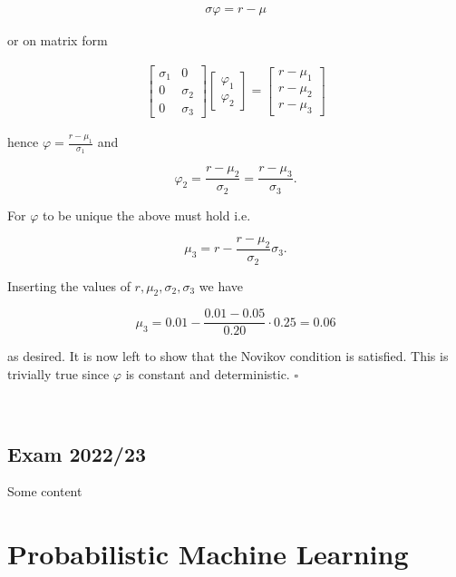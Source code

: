 \documentclass[
]{book}
\begin{document}
\begin{align*}
\sigma \varphi=r-\mu
\end{align*}

or on matrix form

\begin{align*}
\begin{bmatrix}
\sigma_1 & 0\\
0 & \sigma_2\\
0 & \sigma_3
\end{bmatrix}
\begin{bmatrix}
\varphi_1\\
\varphi_2
\end{bmatrix}=
\begin{bmatrix}
r- \mu_1 \\
r- \mu_2\\
r-\mu_3
\end{bmatrix}
\end{align*}

hence \(\varphi =\frac{r-\mu_1}{\sigma_1}\) and

\[
\varphi_2=\frac{r-\mu_2}{\sigma_2}=\frac{r-\mu_3}{\sigma_3}.
\]

For \(\varphi\) to be unique the above must hold i.e.

\[
\mu_3=r-\frac{r-\mu_2}{\sigma_2}\sigma_3.
\]

Inserting the values of \(r,\mu_2,\sigma_2,\sigma_3\) we have

\[
\mu_3=0.01-\frac{0.01-0.05}{0.20}\cdot 0.25=0.06
\]

as desired. It is now left to show that the Novikov condition is satisfied. This is trivially true since \(\varphi\) is constant and deterministic. \(\square\)

\noindent\makebox[\linewidth]{\rule{\textwidth}{0.4pt}}\\
\pagebreak

\hypertarget{exam-202223}{%
\section{Exam 2022/23}\label{exam-202223}}

Some content

\hypertarget{probabilistic-machine-learning}{%
\chapter{Probabilistic Machine Learning}\label{probabilistic-machine-learning}}

\newpage

\printindex

  
\end{document}
